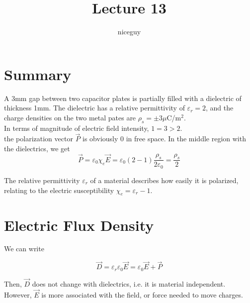 \documentclass[12pt]{article}
\author{niceguy}
\title{Lecture 13}
\begin{document}
\maketitle

\section{Summary}
\begin{ex}
	A 3mm gap between two capacitor plates is partially filled with a dielectric of thickness 1mm. The dielectric has a relative permittivity of $\varepsilon_r = 2$, and the charge densities on the two metal pates are $\rho_s = \pm3 \mu$C/m$^2$. \\
	In terms of magnitude of electric field intensity, $1 = 3 > 2$. \\
	the polarization vector $\vec{P}$ is obviously 0 in free space. In the middle region with the dielectrics, we get
	$$\vec{P} = \varepsilon_0 \chi_e\vec{E} = \varepsilon_0(2-1)\frac{\rho_s}{2\varepsilon_0} = \frac{\rho_s}{2}$$
\end{ex}

The relative permittivity $\varepsilon_r$ of a material describes how easily it is polarized, relating to the electric susceptibility $\chi_e = \varepsilon_r - 1$.

\section{Electric Flux Density}

We can write

$$\vec{D} = \varepsilon_r\varepsilon_0\vec{E} = \varepsilon_0\vec{E} + \vec{P}$$

Then, $\vec{D}$ does not change with dielectrics, i.e. it is material independent. However, $\vec{E}$ is more associated with the field, or force needed to move charges.
\end{document}
